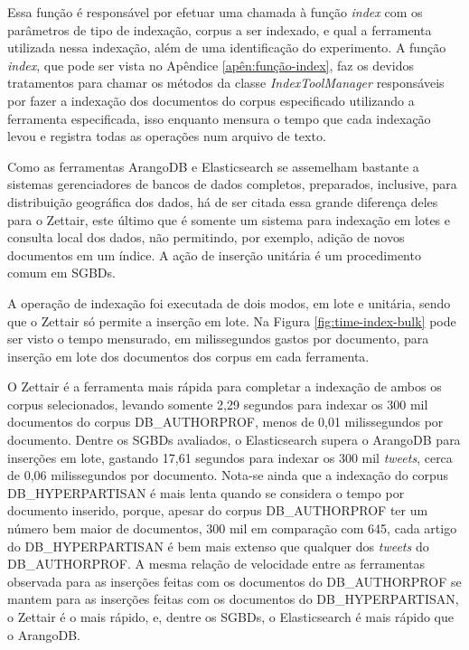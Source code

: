 
			Essa função é responsável por efetuar uma chamada à função \textit{index} com os parâmetros de tipo de indexação, corpus a ser indexado, e qual a ferramenta utilizada nessa indexação, além de uma identificação do experimento.
			A função \textit{index}, que pode ser vista no Apêndice \ref{apên:função-index}, faz os devidos tratamentos para chamar os métodos da classe \textit{IndexToolManager} responsáveis por fazer a indexação dos documentos do corpus especificado utilizando a ferramenta especificada, isso enquanto mensura o tempo que cada indexação levou e registra todas as operações num arquivo de texto.

			
			Como as ferramentas ArangoDB e Elasticsearch se assemelham bastante a sistemas gerenciadores de bancos de dados completos, preparados, inclusive, para distribuição geográfica dos dados, há de ser citada essa grande diferença deles para o Zettair, este último que é somente um sistema para indexação em lotes e consulta local dos dados, não permitindo, por exemplo, adição de novos documentos em um índice. 
			A ação de inserção unitária é um procedimento comum em SGBDs. 			

			A operação de indexação foi executada de dois modos, em lote e unitária, sendo que o Zettair só permite a inserção em lote. 
			Na Figura \ref{fig:time-index-bulk} pode ser visto o tempo mensurado, em milissegundos gastos por documento, para inserção em lote dos documentos dos corpus em cada ferramenta.

			

			O Zettair é a ferramenta mais rápida para completar a indexação de ambos os corpus selecionados, levando somente 2,29 segundos para indexar os 300 mil documentos do corpus DB\_AUTHORPROF, menos de 0,01 milissegundos por documento.
			Dentre os SGBDs avaliados, o Elasticsearch supera o ArangoDB para inserções em lote, gastando 17,61 segundos para indexar os 300 mil \textit{tweets}, cerca de 0,06 milissegundos por documento.
			Nota-se ainda que a indexação do corpus DB\_HYPERPARTISAN é mais lenta quando se considera o tempo por documento inserido, porque, apesar do corpus DB\_AUTHORPROF ter um número bem maior de documentos, 300 mil em comparação com 645, cada artigo do DB\_HYPERPARTISAN é bem mais extenso que qualquer dos \textit{tweets} do DB\_AUTHORPROF.
			A mesma relação de velocidade entre as ferramentas observada para as inserções feitas com os documentos do DB\_AUTHORPROF se mantem para as inserções feitas com os documentos do DB\_HYPERPARTISAN, o Zettair é o mais rápido, e, dentre os SGBDs, o Elasticsearch é mais rápido que o ArangoDB.
			
